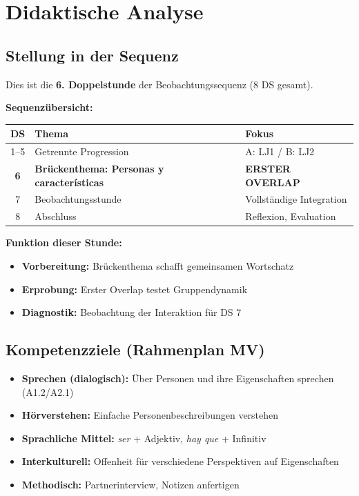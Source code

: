 \documentclass[11pt,a4paper]{article}
\begin{document}
\section{Didaktische Analyse}

\subsection{Stellung in der Sequenz}

Dies ist die \textbf{6. Doppelstunde} der Beobachtungssequenz (8 DS gesamt).

\vspace{0.5em}
\textbf{Sequenzübersicht:}
\begin{center}
\begin{tabular}{|c|l|l|}
\hline
\textbf{DS} & \textbf{Thema} & \textbf{Fokus} \\
\hline
1--5 & Getrennte Progression & A: LJ1 / B: LJ2 \\
\hline
\rowcolor{lightgray} \textbf{6} & \textbf{Brückenthema: Personas y características} & \textbf{ERSTER OVERLAP} \\
\hline
7 & Beobachtungsstunde & Vollständige Integration \\
\hline
8 & Abschluss & Reflexion, Evaluation \\
\hline
\end{tabular}
\end{center}

\textbf{Funktion dieser Stunde:}
\begin{itemize}
    \item \textbf{Vorbereitung:} Brückenthema schafft gemeinsamen Wortschatz
    \item \textbf{Erprobung:} Erster Overlap testet Gruppendynamik
    \item \textbf{Diagnostik:} Beobachtung der Interaktion für DS 7
\end{itemize}

\subsection{Kompetenzziele (Rahmenplan MV)}
\begin{itemize}
    \item \textbf{Sprechen (dialogisch):} Über Personen und ihre Eigenschaften sprechen (A1.2/A2.1)
    \item \textbf{Hörverstehen:} Einfache Personenbeschreibungen verstehen
    \item \textbf{Sprachliche Mittel:} \textit{ser} + Adjektiv, \textit{hay que} + Infinitiv
    \item \textbf{Interkulturell:} Offenheit für verschiedene Perspektiven auf Eigenschaften
    \item \textbf{Methodisch:} Partnerinterview, Notizen anfertigen
\end{itemize}
\end{document}
